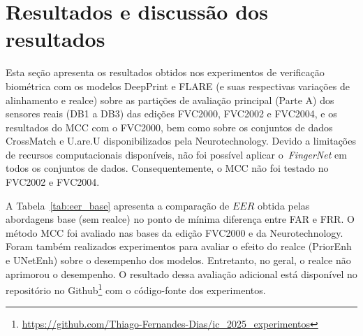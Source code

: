 \section{Resultados e discussão dos resultados}\label{sec:resultados}

Esta seção apresenta os resultados obtidos nos experimentos de verificação biométrica com os modelos DeepPrint e FLARE (e suas respectivas variações de alinhamento e realce) sobre as partições de avaliação principal (Parte A) dos sensores reais (DB1 a DB3) das edições FVC2000, FVC2002 e FVC2004, e os resultados do MCC com o FVC2000, bem como sobre os conjuntos de dados CrossMatch e U.are.U disponibilizados pela Neurotechnology.  Devido a limitações de recursos computacionais disponíveis, não foi possível aplicar o~\textit{FingerNet} em todos os conjuntos de dados. Consequentemente, o MCC não foi testado no FVC2002 e FVC2004. 

A Tabela~\ref{tab:eer_base} apresenta a comparação de $EER$ obtida pelas abordagens base (sem realce) no ponto de mínima diferença entre FAR e FRR. O método MCC foi avaliado nas bases da edição FVC2000 e da Neurotechnology. Foram também realizados experimentos para avaliar o efeito do realce (PriorEnh e UNetEnh) sobre o desempenho dos modelos. Entretanto, no geral, o realce não aprimorou o desempenho. O resultado dessa avaliação adicional está disponível no repositório no Github\footnote{\url{https://github.com/Thiago-Fernandes-Dias/ic_2025_experimentos}} com o código-fonte dos experimentos.

